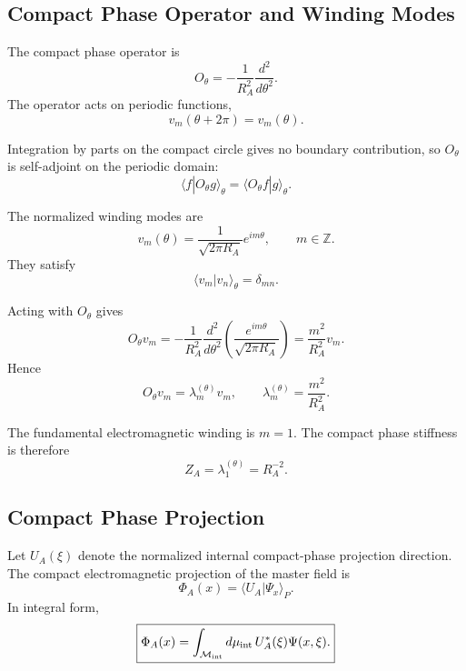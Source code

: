 \documentclass[11pt]{article}
\begin{document}
\subsection{Compact Phase Operator and Winding Modes}

The compact phase operator is
\begin{equation}
\boxed{
O_\theta
=
-\frac{1}{R_A^2}
\frac{d^2}{d\theta^2}.
}
\end{equation}
The operator acts on periodic functions,
\begin{equation}
\boxed{
v_m(\theta+2\pi)=v_m(\theta).
}
\end{equation}

Integration by parts on the compact circle gives no boundary contribution, so
\(O_\theta\) is self-adjoint on the periodic domain:
\begin{equation}
\boxed{
\langle f|O_\theta g\rangle_\theta
=
\langle O_\theta f|g\rangle_\theta.
}
\end{equation}

The normalized winding modes are
\begin{equation}
\boxed{
v_m(\theta)
=
\frac{1}{\sqrt{2\pi R_A}}
e^{im\theta},
\qquad
m\in\mathbb Z.
}
\end{equation}
They satisfy
\begin{equation}
\boxed{
\langle v_m|v_n\rangle_\theta
=
\delta_{mn}.
}
\end{equation}

Acting with \(O_\theta\) gives
\begin{equation}
O_\theta v_m
=
-\frac{1}{R_A^2}
\frac{d^2}{d\theta^2}
\left(
\frac{e^{im\theta}}{\sqrt{2\pi R_A}}
\right)
=
\frac{m^2}{R_A^2}
v_m.
\end{equation}
Hence
\begin{equation}
\boxed{
O_\theta v_m
=
\lambda_m^{(\theta)}v_m,
\qquad
\lambda_m^{(\theta)}
=
\frac{m^2}{R_A^2}.
}
\end{equation}

The fundamental electromagnetic winding is \(m=1\). The compact phase stiffness
is therefore
\begin{equation}
\boxed{
Z_A
=
\lambda_1^{(\theta)}
=
R_A^{-2}.
}
\end{equation}

\subsection{Compact Phase Projection}

Let \(U_A(\xi)\) denote the normalized internal compact-phase projection
direction. The compact electromagnetic projection of the master field is
\begin{equation}
\boxed{
\Phi_A(x)
=
\langle U_A|\Psi_x\rangle_P.
}
\end{equation}
In integral form,
\begin{equation}
\boxed{
\Phi_A(x)
=
\int_{\mathcal M_{\rm int}}
d\mu_{\rm int}\,
U_A^*(\xi)\Psi(x,\xi).
}
\end{equation}
\end{document}
